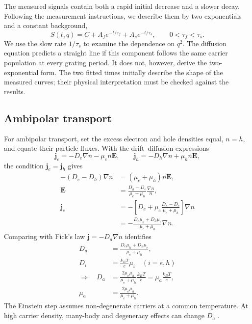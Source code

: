 \documentclass[11pt,a4paper]{article}
\begin{document}
The measured signals contain both a rapid initial decrease and a slower decay. Following the measurement instructions, we describe them by two exponentials and a constant background,
\begin{equation}
S(t,q)=C+A_f e^{-t/\tau_f}+A_s e^{-t/\tau_s},\qquad 0<\tau_f<\tau_s.
\end{equation}
We use the slow rate $1/\tau_s$ to examine the dependence on $q^2$. The diffusion equation predicts a straight line if this component follows the same carrier population at every grating period. It does not, however, derive the two-exponential form. The two fitted times initially describe the shape of the measured curves; their physical interpretation must be checked against the results.

\subsection{Ambipolar transport}
For ambipolar transport, set the excess electron and hole densities equal, $n=h$, and equate their particle fluxes. With the drift--diffusion expressions
\begin{equation}
\mathbf{j}_e=-D_e\nabla n-\mu_en\mathbf{E},\qquad
\mathbf{j}_h=-D_h\nabla n+\mu_hn\mathbf{E},
\end{equation}
the condition $\mathbf{j}_e=\mathbf{j}_h$ gives
\begin{align}
-(D_e-D_h)\nabla n&=(\mu_e+\mu_h)n\mathbf{E},\\
\mathbf{E}&=\frac{D_h-D_e}{\mu_e+\mu_h}\frac{\nabla n}{n},\\
\mathbf{j}_e&=-\left[D_e+\mu_e\frac{D_h-D_e}{\mu_e+\mu_h}\right]\nabla n\\
&=-\frac{D_e\mu_h+D_h\mu_e}{\mu_e+\mu_h}\nabla n.
\end{align}
Comparing with Fick's law $\mathbf{j}=-D_a\nabla n$ identifies
\begin{align}
D_a&=\frac{D_e\mu_h+D_h\mu_e}{\mu_e+\mu_h},\\
D_i&=\frac{k_BT}{e}\mu_i\quad(i=e,h)\\
\Longrightarrow\quad D_a&=\frac{2\mu_e\mu_h}{\mu_e+\mu_h}\frac{k_BT}{e}=\mu_a\frac{k_BT}{e},\\
\mu_a&=\frac{2\mu_e\mu_h}{\mu_e+\mu_h}.
\end{align}
The Einstein step assumes non-degenerate carriers at a common temperature. At high carrier density, many-body and degeneracy effects can change $D_a$ \cite{young}.
\end{document}
